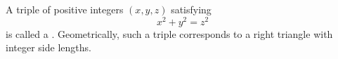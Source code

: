 A triple of positive integers $(x, y, z)$ satisfying
$$x^2 + y^2 = z^2$$
is called a . Geometrically, such a triple corresponds to a right triangle with integer side lengths.

